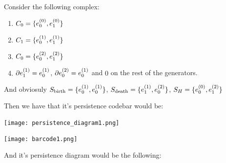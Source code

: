 \begin{example}


%
%
%
%
%


Consider the following complex:

\begin{enumerate}

\item $C_0 = \{e_{0}^{(0)},e_{1}^{(0)}\}$

\item $C_1 = \{e_{0}^{(1)},e_{1}^{(1)}\}$

\item $C_0 = \{e_{0}^{(2)},e_{1}^{(2)}\}$

\item $\partial e_{1}^{(1)}=e_{0}^{(1)}$, $\partial e_{0}^{(2)}=e_{0}^{(1)}$ and 
$0$ on the rest of the generators.
\end{enumerate}

And obviosuly $S_{\text{birth}}=\{
e_{0}^{(1)},
e_{0}^{(1)}
\}$,
$S_{\text{death}}=\{
e_{1}^{(1)},
e_{0}^{(2)}
\}$,
$
S_H=\{
e_{0}^{(0)},
e_{1}^{(2)}
\}
$

Then we have that it's persistence codebar would be:

\begin{center}
\texttt{[image: persistence\_diagram1.png]}
\end{center}




\begin{center}
\texttt{[image: barcode1.png]}
\end{center}

And it's persistence diagram would be the following:

\end{example}






